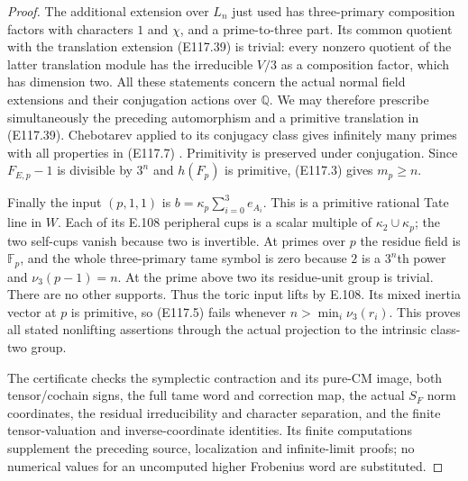 \begin{proof}
The additional extension over $L_n$ just used has three-primary
composition factors with characters $1$ and $\chi$, and a
prime-to-three part.  Its common quotient with the translation
extension (E117.39) is trivial: every nonzero quotient of the
latter translation module has the irreducible $V/3$ as a
composition factor, which has dimension two.
All these statements concern the actual normal field
extensions and their conjugation actions over $\mathbb Q$.
We may therefore prescribe simultaneously the preceding
automorphism and a primitive translation in (E117.39).
Chebotarev applied to its conjugacy class gives infinitely
many primes with all properties in (E117.7)
\cite[VIII,Theorem7.4 and proof]{E_MilneCFT}.
Primitivity is preserved under conjugation.
Since $F_{E,p}-1$ is divisible by $3^n$ and $h(F_p)$ is
primitive, (E117.3) gives $m_p\ge n$.

Finally the input $(p,1,1)$ is
$b=\kappa_p\sum_{i=0}^3e_{A_i}$.
This is a primitive rational Tate line in $W$.
Each of its E.108 peripheral cups is a scalar multiple of
$\kappa_2\cup\kappa_p$; the two self-cups vanish because
two is invertible.  At primes over $p$ the residue field is
$\mathbb F_p$, and the whole three-primary tame symbol is
zero because $2$ is a $3^n$th power and $\nu_3(p-1)=n$.
At the prime above two its residue-unit group is trivial.
There are no other supports.  Thus the toric input lifts by
E.108.  Its mixed inertia vector at $p$ is primitive, so
(E117.5) fails whenever $n>\min_i\nu_3(r_i)$.
This proves all stated nonlifting assertions through the
actual projection to the intrinsic class-two group.

The certificate checks the symplectic contraction and its
pure-CM image, both tensor/cochain signs, the full tame word
and correction map, the actual $S_F$ norm coordinates,
the residual irreducibility and character separation, and
the finite tensor-valuation and inverse-coordinate identities.
Its finite computations supplement the preceding source,
localization and infinite-limit proofs; no numerical values
for an uncomputed higher Frobenius word are substituted.
\end{proof}
